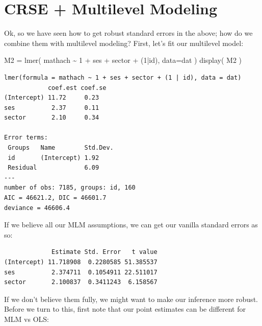 \documentclass[
  letterpaper,
  DIV=11,
  numbers=noendperiod]{scrreprt}
\newenvironment{Shaded}{\begin{snugshade}}{\end{snugshade}}
\newcommand{\AttributeTok}[1]{\textcolor[rgb]{0.49,0.56,0.16}{#1}}
\newcommand{\DecValTok}[1]{\textcolor[rgb]{0.25,0.63,0.44}{#1}}
\newcommand{\FunctionTok}[1]{\textcolor[rgb]{0.02,0.16,0.49}{#1}}
\newcommand{\NormalTok}[1]{\textcolor[rgb]{0.00,0.44,0.13}{#1}}
\newcommand{\OtherTok}[1]{\textcolor[rgb]{0.00,0.44,0.13}{#1}}
\newcommand{\SpecialCharTok}[1]{\textcolor[rgb]{0.25,0.44,0.63}{#1}}
\begin{document}
\hypertarget{crse-multilevel-modeling}{%
\section{CRSE + Multilevel Modeling}\label{crse-multilevel-modeling}}

Ok, so we have seen how to get robust standard errors in the above; how
do we combine them with multilevel modeling? First, let's fit our
multilevel model:

\begin{Shaded}
\begin{Highlighting}[]
\NormalTok{M2 }\OtherTok{=} \FunctionTok{lmer}\NormalTok{( mathach }\SpecialCharTok{\textasciitilde{}} \DecValTok{1} \SpecialCharTok{+}\NormalTok{ ses }\SpecialCharTok{+}\NormalTok{ sector }\SpecialCharTok{+}\NormalTok{ (}\DecValTok{1}\SpecialCharTok{|}\NormalTok{id), }\AttributeTok{data=}\NormalTok{dat )}
\FunctionTok{display}\NormalTok{( M2 )}
\end{Highlighting}
\end{Shaded}

\begin{verbatim}
lmer(formula = mathach ~ 1 + ses + sector + (1 | id), data = dat)
            coef.est coef.se
(Intercept) 11.72     0.23  
ses          2.37     0.11  
sector       2.10     0.34  

Error terms:
 Groups   Name        Std.Dev.
 id       (Intercept) 1.92    
 Residual             6.09    
---
number of obs: 7185, groups: id, 160
AIC = 46621.2, DIC = 46601.7
deviance = 46606.4 
\end{verbatim}

If we believe all our MLM assumptions, we can get our vanilla standard
errors as so:

\begin{Shaded}
\end{Shaded}

\begin{verbatim}
             Estimate Std. Error   t value
(Intercept) 11.718908  0.2280585 51.385537
ses          2.374711  0.1054911 22.511017
sector       2.100837  0.3411243  6.158567
\end{verbatim}

If we don't believe them fully, we might want to make our inference more
robust. Before we turn to this, first note that our point estimates can
be different for MLM vs OLS:
\end{document}
